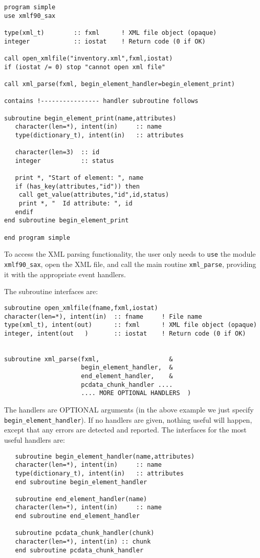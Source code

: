 \documentclass[11pt]{article}
\begin{document}
\begin{verbatim}
program simple
use xmlf90_sax

type(xml_t)        :: fxml      ! XML file object (opaque)
integer            :: iostat    ! Return code (0 if OK)

call open_xmlfile("inventory.xml",fxml,iostat)
if (iostat /= 0) stop "cannot open xml file"

call xml_parse(fxml, begin_element_handler=begin_element_print)

contains !---------------- handler subroutine follows

subroutine begin_element_print(name,attributes)
   character(len=*), intent(in)     :: name
   type(dictionary_t), intent(in)   :: attributes
   
   character(len=3)  :: id
   integer           :: status
   
   print *, "Start of element: ", name
   if (has_key(attributes,"id")) then
   	call get_value(attributes,"id",id,status)
	print *, "  Id attribute: ", id
   endif
end subroutine begin_element_print

end program simple
\end{verbatim}
%
To access the XML parsing functionality, the user only needs to \texttt{use}
the module \texttt{xmlf90\_sax}, open the XML file, and call the main routine
\texttt{xml\_parse}, providing it with the appropriate event handlers.

The subroutine interfaces are:

\begin{verbatim}
subroutine open_xmlfile(fname,fxml,iostat)
character(len=*), intent(in)  :: fname     ! File name
type(xml_t), intent(out)      :: fxml      ! XML file object (opaque)
integer, intent(out   )       :: iostat    ! Return code (0 if OK)


subroutine xml_parse(fxml,                   &
                     begin_element_handler,  &
                     end_element_handler,    &
                     pcdata_chunk_handler ....
                     .... MORE OPTIONAL HANDLERS  )

\end{verbatim}

The handlers are OPTIONAL arguments (in the above example we just
specify \texttt{begin\_element\_handler}). If no handlers are given,
nothing useful will happen, except that any errors are detected and
reported.  The interfaces for the most useful handlers are:

\begin{verbatim}    
   subroutine begin_element_handler(name,attributes)
   character(len=*), intent(in)     :: name
   type(dictionary_t), intent(in)   :: attributes
   end subroutine begin_element_handler

   subroutine end_element_handler(name)
   character(len=*), intent(in)     :: name
   end subroutine end_element_handler

   subroutine pcdata_chunk_handler(chunk)
   character(len=*), intent(in) :: chunk
   end subroutine pcdata_chunk_handler
\end{verbatim}
\end{document}
